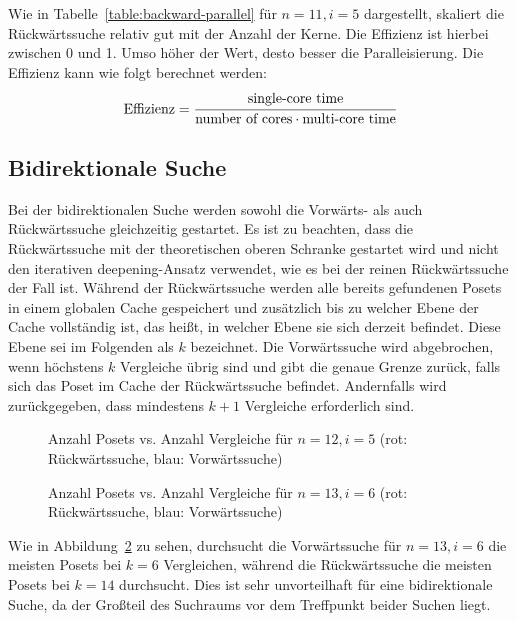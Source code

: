 \documentclass[10pt,journal,compsoc]{IEEEtran}
\begin{document}
Wie in Tabelle~\ref{table:backward-parallel} für $n = 11, i = 5$ dargestellt, skaliert die Rückwärtssuche relativ gut mit der Anzahl der Kerne.
Die Effizienz ist hierbei zwischen 0 und 1.
Umso höher der Wert, desto besser die Paralleisierung.
Die Effizienz kann wie folgt berechnet werden:
\[
  \text{Effizienz} = \cfrac{\text{single-core time}}{\text{number of cores} \cdot \text{multi-core time}}
\]

\subsection{Bidirektionale Suche} \label{sec:bidirectional}

Bei der bidirektionalen Suche werden sowohl die Vorwärts- als auch Rückwärtssuche gleichzeitig gestartet.
Es ist zu beachten, dass die Rückwärtssuche mit der theoretischen oberen Schranke gestartet wird und nicht den iterativen deepening-Ansatz verwendet, wie es bei der reinen Rückwärtssuche der Fall ist.
Während der Rückwärtssuche werden alle bereits gefundenen Posets in einem globalen Cache gespeichert und zusätzlich bis zu welcher Ebene der Cache vollständig ist, das heißt, in welcher Ebene sie sich derzeit befindet.
Diese Ebene sei im Folgenden als $k$ bezeichnet.
Die Vorwärtssuche wird abgebrochen, wenn höchstens $k$ Vergleiche übrig sind und gibt die genaue Grenze zurück, falls sich das Poset im Cache der Rückwärtssuche befindet.
Andernfalls wird zurückgegeben, dass mindestens $k + 1$ Vergleiche erforderlich sind.

\begin{figure}[h!] %
  
  \centering
  \caption{Anzahl Posets vs. Anzahl Vergleiche für $n=12, i=5$ (rot: Rückwärtssuche, blau: Vorwärtssuche)}
  \label{fig:backward_forward_count_12_5}
\end{figure}

\begin{figure}[h!]
  
  \centering
  \caption{Anzahl Posets vs. Anzahl Vergleiche für $n=13, i=6$ (rot: Rückwärtssuche, blau: Vorwärtssuche)}
  \label{fig:backward_forward_count_13_6}
\end{figure}

Wie in Abbildung~\ref{fig:backward_forward_count_13_6} zu sehen, durchsucht die Vorwärtssuche für $n = 13, i = 6$ die meisten Posets bei $k = 6$ Vergleichen, während die Rückwärtssuche die meisten Posets bei $k = 14$ durchsucht.
Dies ist sehr unvorteilhaft für eine bidirektionale Suche, da der Großteil des Suchraums vor dem Treffpunkt beider Suchen liegt.
\end{document}
